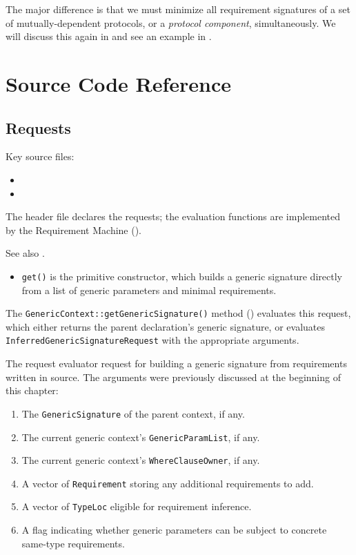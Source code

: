\documentclass[../generics]{subfiles}
\begin{document}
The major difference is that we must minimize all requirement signatures of a set of mutually-dependent protocols, or a \emph{protocol component}, simultaneously. We will discuss this again in  and see an example in .

\section{Source Code Reference}\label{buildinggensigsourceref}

\subsection*{Requests}

Key source files:
\begin{itemize}
\item {}
\item {}
\end{itemize}

The header file declares the requests; the evaluation functions are implemented by the Requirement Machine ().

See also .
\begin{itemize}
\item \texttt{get()} is the primitive constructor, which builds a generic signature directly from a list of generic parameters and minimal requirements.
\end{itemize}

The \texttt{GenericContext::getGenericSignature()} method () evaluates this request, which either returns the parent declaration's generic signature, or evaluates \texttt{InferredGenericSignatureRequest} with the appropriate arguments.

The request evaluator request for building a generic signature from requirements written in source. The arguments were previously discussed at the beginning of this chapter:
\begin{enumerate}
\item The \texttt{GenericSignature} of the parent context, if any.
\item The current generic context's \texttt{GenericParamList}, if any.
\item The current generic context's \texttt{WhereClauseOwner}, if any.
\item A vector of \texttt{Requirement} storing any additional requirements to add.
\item A vector of \texttt{TypeLoc} eligible for requirement inference.
\item A flag indicating whether generic parameters can be subject to concrete same-type requirements.
\end{enumerate}
\end{document}
